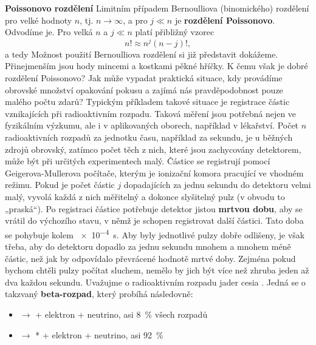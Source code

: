\begin{mdframed}[style=mdexam]
  \begin{example}\label{mai:exam068}
    \textbf{Poissonovo rozdělení}\newline
    Limitním případem Bernoulliova (binomického) rozdělení pro velké hodnoty \(n\), tj. \(n
    \rightarrow \infty\), a pro \(j \ll n\) je \textbf{rozdělení Poissonovo}. Odvodíme je. Pro velká
    \(n\) a \(j \ll n\) platí přibližný vzorec
    \begin{equation*}
      n! \approx n^j(n-j)!,
    \end{equation*}
    a tedy   Možnost použití Bernoulliova rozdělení si již představit dokážeme. Přinejmenším jsou
    hody mincemi a kostkami pěkné hříčky. K čemu však je dobré rozdělení Poissonovo? Jak může
    vypadat praktická situace, kdy provádíme obrovské množství opakování pokusu a zajímá nás
    pravděpodobnost pouze malého počtu zdarů? Typickým příkladem takové situace je registrace částic
    vznikajících při radioaktivním rozpadu. Taková měření jsou potřebná nejen ve fyzikálním výzkumu,
    ale i v aplikovaných oborech, například v lékařství. Počet \(n\) radioaktivních rozpadů za
    jednotku času, například za sekundu, je u běžných zdrojů obrovský, zatímco počet těch z nich,
    které jsou zachycovány detektorem, může být při určitých experimentech malý. Částice se
    registrují pomocí Geigerova-Mullerova počítače, kterým je ionizační komora pracující ve vhodném
    režimu. Pokud je počet částic \(j\) dopadajících za jednu sekundu do detektoru velmi malý,
    vyvolá každá z nich měřitelný a dokonce slyšitelný pulz (v obvodu to „praská“). Po registraci
    částice potřebuje detektor jistou \textbf{mrtvou dobu}, aby se vrátil do výchozího stavu, v němž
    je schopen registrovat další částici. Tato doba se pohybuje kolem \qty{e-4}{s}. Aby byly
    jednotlivé pulzy dobře odlišeny, je však třeba, aby do detektoru dopadlo za jednu sekundu mnohem
    a mnohem méně částic, než jak by odpovídalo převrácené hodnotě mrtvé doby. Zejména pokud bychom
    chtěli pulzy počítat sluchem, nemělo by jich být více než zhruba jeden až dva každou sekundu.
    Uvažujme o radioaktivním rozpadu jader cesia . Jedná se o takzvaný
    \textbf{beta-rozpad}, který probíhá následovně:
    \begin{itemize}
      \item {} \(\longrightarrow\)  + elektron + neutrino, asi \qty{8}{\percent} 
            všech rozpadů
      \item {} \(\longrightarrow\) * + elektron + neutrino, asi \qty{92}{\percent} 

\end{itemize}
\end{example}
\end{mdframed}
